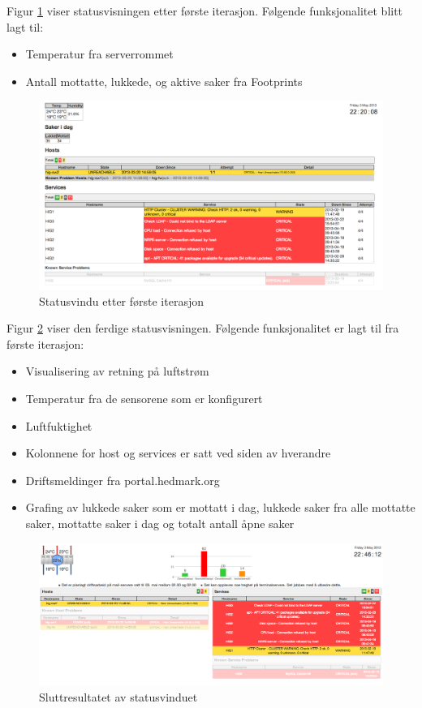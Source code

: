 Figur \ref{statusvindu_first} viser statusvisningen etter første iterasjon. Følgende funksjonalitet blitt lagt til:
\begin{itemize}
	\item Temperatur fra serverrommet
	\item Antall mottatte, lukkede, og aktive saker fra Footprints
\end{itemize}

\begin{figure}[H]
    \centering
    \includegraphics[scale=0.3]{img/statusvindu_first}
    \caption{Statusvindu etter første iterasjon}
    \label{statusvindu_first}
\end{figure}

Figur \ref{statusvindu_final} viser den ferdige statusvisningen. Følgende funksjonalitet er lagt til fra første iterasjon:

\begin{itemize}
	\item Visualisering av retning på luftstrøm
	\item Temperatur fra de sensorene som er konfigurert
	\item Luftfuktighet
	\item Kolonnene for host og services er satt ved siden av hverandre
	\item Driftsmeldinger fra portal.hedmark.org
	\item Grafing av lukkede saker som er mottatt i dag, lukkede saker fra alle mottatte saker, mottatte saker i dag og totalt antall åpne saker
\end{itemize}

\begin{figure}[H]
    \centering
    \includegraphics[scale=0.3]{img/statusvindu_final}
    \caption{Sluttresultatet av statusvinduet}
    \label{statusvindu_final}
\end{figure}


